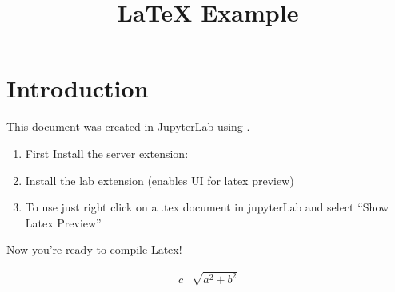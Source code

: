\documentclass{article}
\begin{document}
\title{{\LaTeX} Example}


\maketitle

\section{Introduction}

This document was created in JupyterLab using .

\begin{enumerate}
    \item{First Install the server extension:}
    \item{Install the lab extension (enables UI for latex preview)}
    \item{To use just right click on a .tex document in jupyterLab and select ``Show Latex Preview''}
\end{enumerate}

Now you're ready to compile Latex!

\begin{align}
    c & \sqrt{a^2 + b^2}
\end{align}
\end{document}
